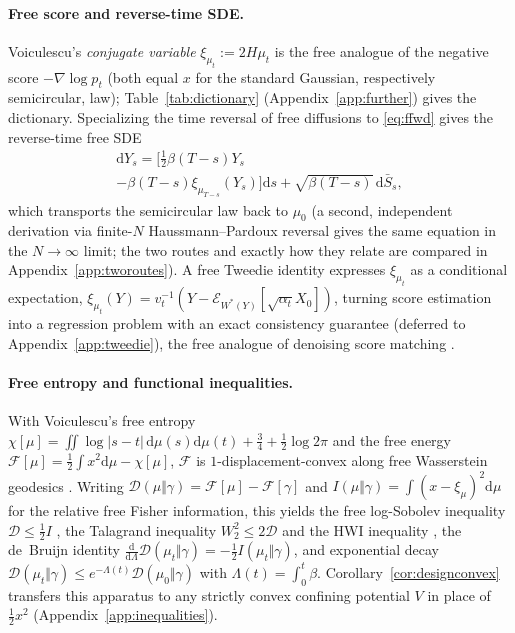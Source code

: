 \documentclass[11pt]{article}
\newcommand{\dd}{\mathrm{d}}
\newcommand{\Wt}{W_{2}}
\newcommand{\Ent}{\chi}
\newcommand{\Free}{\mathcal{F}}
\newcommand{\Div}{\mathcal{D}}
\newcommand{\relF}{I}
\newcommand{\abs}[1]{\lvert #1\rvert}
\newcommand{\Econd}[1]{\mathcal{E}_{#1}}
\theoremstyle{plain}
\theoremstyle{definition}
\theoremstyle{remark}
\begin{document}
\paragraph{Free score and reverse-time SDE.} Voiculescu's \emph{conjugate variable}
$\xi_{\mu_t}:=2H\mu_t$ is the free analogue of the negative score $-\nabla\log p_t$
(both equal $x$ for the standard Gaussian, respectively semicircular, law);
Table~\ref{tab:dictionary} (Appendix~\ref{app:further}) gives the dictionary. Specializing the time reversal of free diffusions
\citep{Dabrowski2014} to \eqref{eq:ffwd} gives the reverse-time free SDE
\begin{multline}\label{eq:reversesde}
  \dd Y_s = \big[\tfrac12\beta(T\!-\!s)Y_s \\
  - \beta(T\!-\!s)\xi_{\mu_{T-s}}(Y_s)\big]
  \dd s + \sqrt{\beta(T\!-\!s)}\,\dd\bar S_s,
\end{multline}
which transports the semicircular law back to $\mu_0$ (a second, independent
derivation via finite-$N$ Haussmann--Pardoux reversal gives the same equation in the
$N\to\infty$ limit; the two routes and exactly how they relate are compared in
Appendix~\ref{app:tworoutes}). A free Tweedie identity
expresses $\xi_{\mu_t}$ as a conditional expectation, $\xi_{\mu_t}(Y)=v_t^{-1}(Y-
\Econd{W^*(Y)}[\sqrt{\alpha_t}X_0])$, turning score estimation into a regression
problem with an exact consistency guarantee (deferred to
Appendix~\ref{app:tweedie}), the free analogue of denoising score matching
\citep{Vincent2011, Hyvarinen2005}.


\paragraph{Free entropy and functional inequalities.} With Voiculescu's free entropy
$\Ent[\mu]=\iint\log\abs{s-t}\,\dd\mu(s)\dd\mu(t)+\tfrac34+\tfrac12\log2\pi$ and the free energy
$\Free[\mu]=\tfrac12\!\int\! x^2\dd\mu-\Ent[\mu]$, $\Free$ is $1$-displacement-convex along free
Wasserstein geodesics \citep{Biane2003}. Writing $\Div(\mu\Vert\gamma)=\Free[\mu]-\Free[\gamma]$ and
$\relF(\mu\Vert\gamma)=\int(x-\xi_\mu)^2\dd\mu$ for the relative free Fisher information, this yields the free
log-Sobolev inequality $\Div\le\tfrac12\relF$ \citep{Biane2003}, the Talagrand inequality
$\Wt^2\le2\Div$ \citep{HiaiPetzUeda2004} and the HWI inequality \citep{LedouxPopescu2009}, the de~Bruijn identity
$\tfrac{\dd}{\dd\Lambda}\Div(\mu_t\Vert\gamma)=-\tfrac12\relF(\mu_t\Vert\gamma)$, and exponential decay
$\Div(\mu_t\Vert\gamma)\le e^{-\Lambda(t)}\Div(\mu_0\Vert\gamma)$ with $\Lambda(t)=\int_0^t\beta$.
Corollary~\ref{cor:designconvex} transfers this apparatus to any strictly convex confining potential $V$ in
place of $\tfrac12x^2$ (Appendix~\ref{app:inequalities}).
\end{document}
